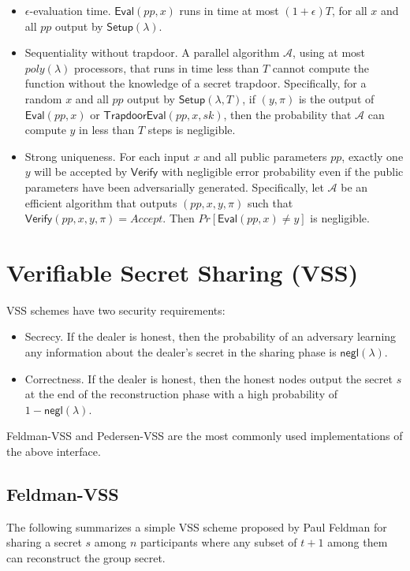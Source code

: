 \documentclass[letterpaper,twocolumn,10pt]{article}
\theoremstyle{definition}
\theoremstyle{remark}
\begin{document}
\begin{itemize}
    \item $\epsilon$-evaluation time. $\mathsf{Eval}(pp, x)$ runs in time at most $(1 + \epsilon) T$, for all $x$ and all $pp$ output by $\mathsf{Setup}(\lambda)$.
    \item Sequentiality without trapdoor. A parallel algorithm $\mathcal{A}$, using at most $poly(\lambda)$ processors, that runs in time less than $T$ cannot compute the function without the knowledge of a secret trapdoor. Specifically, for a random $x$ and all $pp$ output by $\mathsf{Setup}(\lambda, T)$, if $(y, \pi)$ is the output of $\mathsf{Eval}(pp, x)$ or $\mathsf{TrapdoorEval}(pp,x,sk)$, then the probability that $\mathcal{A}$ can compute $y$ in less than $T$ steps is negligible.
    \item Strong uniqueness. For each input $x$ and all public parameters $pp$, exactly one $y$ will be accepted by $\mathsf{Verify}$ with negligible error probability even if the public parameters have been adversarially generated. Specifically, let $\mathcal{A}$ be an efficient algorithm that outputs $(pp, x, y, \pi)$ such that $\mathsf{Verify}(pp, x, y, \pi) = Accept$. Then $Pr[\mathsf{Eval}(pp, x) \neq y]$ is negligible.
\end{itemize}

\section{Verifiable Secret Sharing (VSS)}
\label{appendix:vss}
VSS schemes have two security requirements:
\begin{itemize}
    \item Secrecy. If the dealer is honest, then the probability of an adversary learning
    any information about the dealer’s secret in the sharing phase is $\mathsf{negl}(\lambda)$.
    \item Correctness. If the dealer is honest, then the honest nodes output the secret
    $s$ at the end of the reconstruction phase with a high probability of $1 - \mathsf{negl}(\lambda)$.
\end{itemize}
Feldman-VSS \cite{feldman1987practical} and Pedersen-VSS \cite{pedersen1991non} are the most commonly used implementations of the above interface.

\subsection{Feldman-VSS}
\label{appendix:feldmanVSS}
The following summarizes a simple VSS scheme proposed by Paul Feldman for sharing a secret $s$ among $n$ participants where any subset of $t + 1$ among them can reconstruct the group secret.
\end{document}
